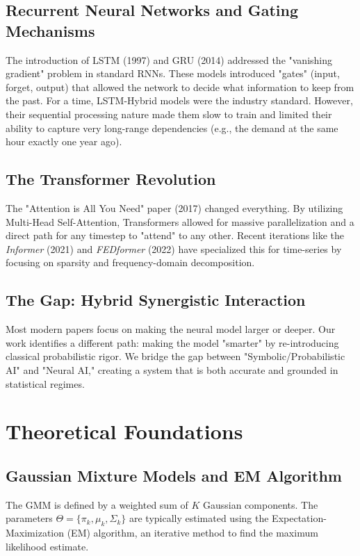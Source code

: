 \documentclass[conference]{IEEEtran}
\begin{document}
\subsection{Recurrent Neural Networks and Gating Mechanisms}
The introduction of LSTM (1997) and GRU (2014) addressed the "vanishing gradient" problem in standard RNNs. These models introduced "gates" (input, forget, output) that allowed the network to decide what information to keep from the past. For a time, LSTM-Hybrid models were the industry standard. However, their sequential processing nature made them slow to train and limited their ability to capture very long-range dependencies (e.g., the demand at the same hour exactly one year ago).

\subsection{The Transformer Revolution}
The "Attention is All You Need" paper (2017) changed everything. By utilizing Multi-Head Self-Attention, Transformers allowed for massive parallelization and a direct path for any timestep to "attend" to any other. Recent iterations like the \textit{Informer} (2021) and \textit{FEDformer} (2022) have specialized this for time-series by focusing on sparsity and frequency-domain decomposition.

\subsection{The Gap: Hybrid Synergistic Interaction}
Most modern papers focus on making the neural model larger or deeper. Our work identifies a different path: making the model "smarter" by re-introducing classical probabilistic rigor. We bridge the gap between "Symbolic/Probabilistic AI" and "Neural AI," creating a system that is both accurate and grounded in statistical regimes.

\section{Theoretical Foundations}
\subsection{Gaussian Mixture Models and EM Algorithm}
The GMM is defined by a weighted sum of $K$ Gaussian components. The parameters $\Theta = \{\pi_k, \mu_k, \Sigma_k\}$ are typically estimated using the Expectation-Maximization (EM) algorithm, an iterative method to find the maximum likelihood estimate.
\end{document}
